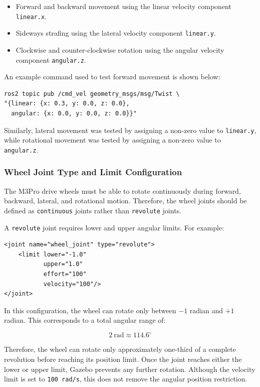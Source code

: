 \documentclass{article}
\begin{document}
\begin{itemize}
    \item Forward and backward movement using the linear velocity component \texttt{linear.x}.
    \item Sideways strafing using the lateral velocity component \texttt{linear.y}.
    \item Clockwise and counter-clockwise rotation using the angular velocity component \texttt{angular.z}.
\end{itemize}

An example command used to test forward movement is shown below:

\begin{verbatim}
ros2 topic pub /cmd_vel geometry_msgs/msg/Twist \
"{linear: {x: 0.3, y: 0.0, z: 0.0},
  angular: {x: 0.0, y: 0.0, z: 0.0}}"
\end{verbatim}

Similarly, lateral movement was tested by assigning a non-zero value to \texttt{linear.y}, while rotational movement was tested by assigning a non-zero value to \texttt{angular.z}.


\subsubsection{Wheel Joint Type and Limit Configuration}

The M3Pro drive wheels must be able to rotate continuously during forward, backward, lateral, and rotational motion. Therefore, the wheel joints should be defined as \texttt{continuous} joints rather than \texttt{revolute} joints.

A \texttt{revolute} joint requires lower and upper angular limits. For example:

\begin{verbatim}
<joint name="wheel_joint" type="revolute">
    <limit lower="-1.0"
           upper="1.0"
           effort="100"
           velocity="100"/>
</joint>
\end{verbatim}

In this configuration, the wheel can rotate only between $-1$ radian and $+1$ radian. This corresponds to a total angular range of:

\[
2~\text{rad} \approx 114.6^\circ
\]

Therefore, the wheel can rotate only approximately one-third of a complete revolution before reaching its position limit. Once the joint reaches either the lower or upper limit, Gazebo prevents any further rotation. Although the velocity limit is set to \texttt{100 rad/s}, this does not remove the angular position restriction.
\end{document}
